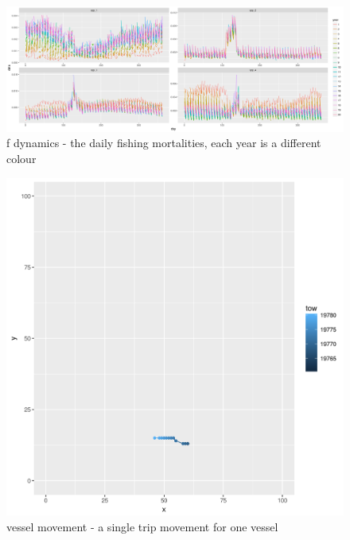 \documentclass[review]{elsarticle}
\begin{document}
\begin{figure}[!ht]
	\includegraphics[width = \linewidth]{../tests/plots/fDynamics}
	\caption{f dynamics - the daily fishing mortalities, each year is a
		different colour}
	\label{fig:3}
\end{figure}	

\begin{figure}[!ht]
	\includegraphics[width = \linewidth]{../tests/plots/vessel_move}
	\caption{vessel movement - a single trip movement for one vessel}
	\label{fig:4}
\end{figure}	
\end{document}
